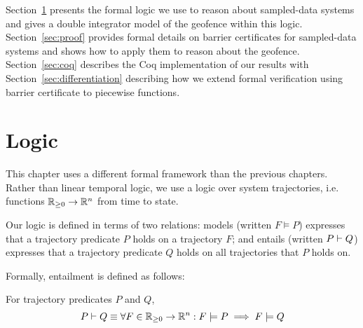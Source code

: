 Section~\ref{sec:model} presents the formal logic we use to reason about
sampled-data systems and gives a double integrator model of the geofence
within this logic. Section~\ref{sec:proof} provides formal details on
barrier certificates for sampled-data systems and shows how to apply them
to reason about the geofence. Section~\ref{sec:coq} describes the Coq
implementation of our results with Section~\ref{sec:differentiation}
describing how we extend formal verification using barrier certificate to
piecewise functions.

\section{Logic}
\label{sec:model}
This chapter uses a different formal framework than the previous
chapters. Rather than linear temporal logic, we use a logic over system
trajectories, i.e. functions $\mathbb{R}_{\geq 0} \rightarrow \mathbb{R}^n$ from time to state.

Our logic is defined in terms of two relations: models (written $F \models
P$) expresses that a trajectory predicate $P$ holds on a trajectory $F$;
and entails (written $P \vdash Q$) expresses that a trajectory predicate
$Q$ holds on all trajectories that $P$ holds on.

Formally, entailment is defined as follows:
\begin{definition}[Entailment]
For trajectory predicates $P$ and $Q$,
\[
P \vdash Q \equiv \forall F \in \mathbb{R}_{\geq 0} \rightarrow \mathbb{R}^n : F \models P \implies F \models Q
\]
\label{def:entailment}
\end{definition}

